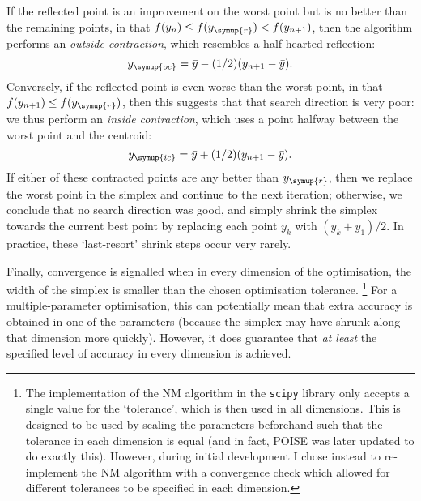 If the reflected point is an improvement on the worst point but is no better than the remaining points, in that $f(y_n) \leq f(y_{\symup{r}}) < f(y_{n+1})$, then the algorithm performs an \textit{outside contraction}, which resembles a half-hearted reflection:
\begin{equation}
    \label{eq:nm_outside_contract}
    y_{\symup{oc}} = \bar{y} - (1/2)(y_{n+1} - \bar{y}).
\end{equation}
Conversely, if the reflected point is even worse than the worst point, in that $f(y_{n+1}) \leq f(y_{\symup{r}})$, then this suggests that that search direction is very poor: we thus perform an \textit{inside contraction}, which uses a point halfway between the worst point and the centroid:
\begin{equation}
    \label{eq:nm_inside_contract}
    y_{\symup{ic}} = \bar{y} + (1/2)(y_{n+1} - \bar{y}).
\end{equation}
If either of these contracted points are any better than $y_{\symup{r}}$, then we replace the worst point in the simplex and continue to the next iteration; otherwise, we conclude that no search direction was good, and simply shrink the simplex towards the current best point by replacing each point $y_k$ with $(y_k + y_1)/2$.
In practice, these `last-resort' shrink steps occur very rarely.

Finally, convergence is signalled when in every dimension of the optimisation, the width of the simplex is smaller than the chosen optimisation tolerance.%
\footnote{The implementation of the NM algorithm in the \texttt{scipy} library only accepts a single value for the `tolerance', which is then used in all dimensions.
This is designed to be used by scaling the parameters beforehand such that the tolerance in each dimension is equal (and in fact, POISE was later updated to do exactly this).
However, during initial development I chose instead to re-implement the NM algorithm with a convergence check which allowed for different tolerances to be specified in each dimension.}
For a multiple-parameter optimisation, this can potentially mean that extra accuracy is obtained in one of the parameters (because the simplex may have shrunk along that dimension more quickly).
However, it does guarantee that \textit{at least} the specified level of accuracy in every dimension is achieved.
